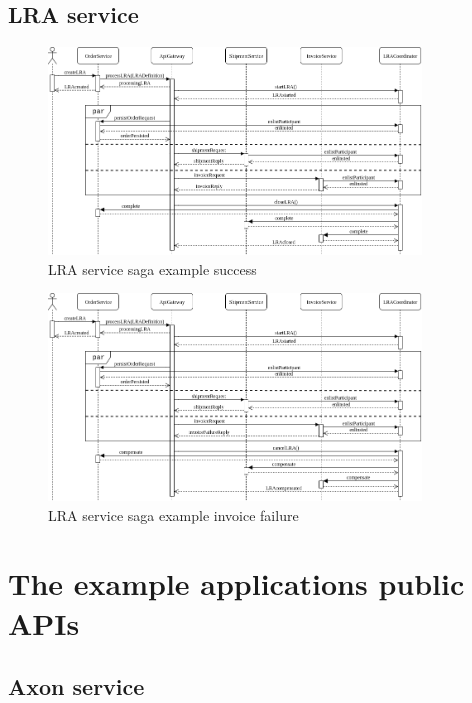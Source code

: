 \documentclass[oneside,
  digital, %
  table,   %
  lof,     %
  lot,     %
]{fithesis3}
\begin{document}
\clearpage
\section{LRA service}

\begin{figure}[h]
    \begin{center}
        \includegraphics[height=55mm]{images/sequence/validSagaLRA.png}
    \end{center}
    \caption{LRA service saga example success}
\end{figure}

\hfill \break

\begin{figure}[h]
    \begin{center}
        \includegraphics[height=55mm]{images/sequence/invoiceFailSagaLRA.png}
    \end{center}
    \caption{LRA service saga example invoice failure}
\end{figure}


\clearpage
\chapter{The example applications public APIs}
\label{sec:appendixAPI}

\section{Axon service}
\end{document}
